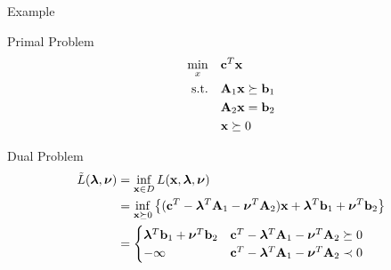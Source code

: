 \documentclass[12pt,notes,mathserif]{beamer}
\begin{document}
\begin{frame}
	{Example}

	\begin{block}{Primal Problem}
		\vspace{-1em}
		\begin{equation}
			\begin{aligned}
				\min_x \quad        & \mathbf{c}^T \mathbf{x}            \\
				\textrm{s.t.} \quad & \mathbf{A}_1 \mathbf{x} \succeq \mathbf{b}_1 \\
				                    & \mathbf{A}_2 \mathbf{x} = \mathbf{b}_2   \\
				                    & \mathbf{x} \succeq 0       \\
			\end{aligned}
		\end{equation}
	\end{block}
	\pause
	\begin{block}{Dual Problem}
		\vspace{-1em}
		\begin{equation*}
			\begin{aligned}
				\tilde{L}(\boldsymbol{\lambda}, \boldsymbol{\nu} ) & = \inf_{\mathbf{x} \in D} L(\mathbf{x}, \boldsymbol{\lambda}, \boldsymbol{\nu}) \\
										 & = \inf_{\mathbf{x} \succeq 0} \left\{ (\mathbf{c}^T - \boldsymbol{\lambda}^T \mathbf{A}_1 - \boldsymbol{\nu}^T \mathbf{A}_2 ) \mathbf{x} + \boldsymbol{\lambda}^T \mathbf{b}_1 + \boldsymbol{\nu}^T \mathbf{b}_2 \right\}    \\ 
										 & = \begin{cases} 
											\boldsymbol{\lambda}^T \mathbf{b}_1 + \boldsymbol{\nu}^T \mathbf{b}_2 & \mathbf{c}^T - \boldsymbol{\lambda}^T \mathbf{A}_1 - \boldsymbol{\nu}^T \mathbf{A}_2 \succeq 0 \\
											-\infty & \mathbf{c}^T - \boldsymbol{\lambda}^T \mathbf{A}_1 - \boldsymbol{\nu}^T \mathbf{A}_2 \prec 0 \\
										\end{cases}  \\
			\end{aligned}
		\end{equation*}
	\end{block}
\end{frame}
\end{document}
